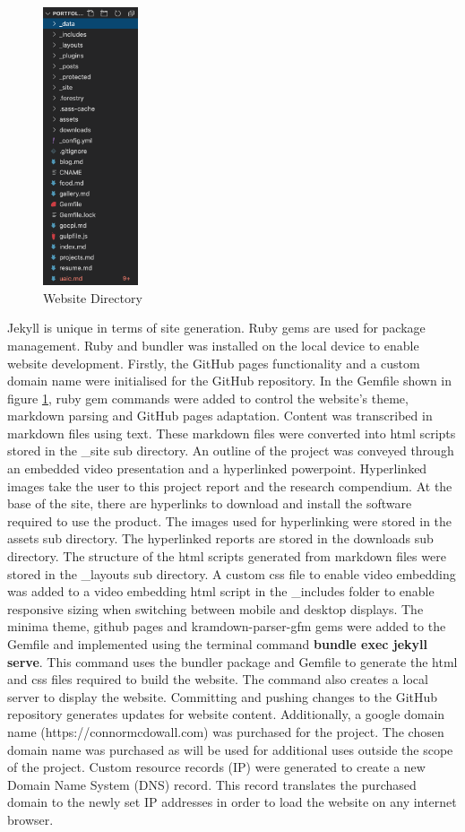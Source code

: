 \documentclass[12pt]{article}
\begin{document}
\begin{figure}
	\centering
	\includegraphics[width = 0.25\textwidth]{website-dir.png}
	\caption{Website Directory}
	\label{fig:WD}
\end{figure}
Jekyll is unique in terms of site generation. Ruby gems are used for package management. 
Ruby and bundler was installed on the local device to enable website development.
Firstly, the GitHub pages functionality and a custom domain name were initialised for the GitHub repository.
In the Gemfile shown in figure \ref{fig:WD}, ruby gem commands were added to control the website's theme, markdown parsing and GitHub pages adaptation.
Content was transcribed in markdown files using text.
These markdown files were converted into html scripts stored in the \_site sub directory. 
An outline of the project was conveyed through an embedded video presentation and a hyperlinked powerpoint.
Hyperlinked images take the user to this project report and the research compendium.
At the base of the site, there are hyperlinks to download and install the software required to use the product.
The images used for hyperlinking were stored in the assets sub directory.
The hyperlinked reports are stored in the downloads sub directory.
The structure of the html scripts generated from markdown files were stored in the \_layouts sub directory.
A custom css file to enable video embedding was added to a video embedding html script in the \_includes folder to enable responsive sizing when switching between mobile and desktop displays.
The minima theme, github pages and kramdown-parser-gfm gems were added to the Gemfile and implemented using the terminal command \textbf{bundle exec jekyll serve}.
This command uses the bundler package and Gemfile to generate the html and css files required to build the website.
The command also creates a local server to display the website.
Committing and pushing changes to the GitHub repository generates updates for website content.
Additionally, a google domain name (https://connormcdowall.com) was purchased for the project. 
The chosen domain name was purchased as will be used for additional uses outside the scope of the project.
Custom resource records (IP) were generated to create a new Domain Name System (DNS) record. 
This record translates the purchased domain to the newly set IP addresses in order to load the website on any internet browser.
\end{document}
